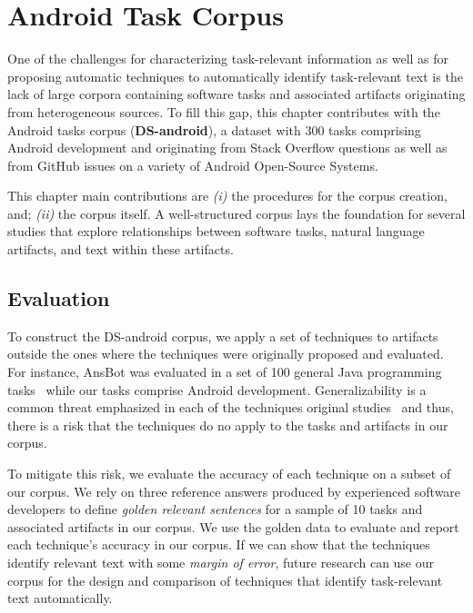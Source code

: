 \setcounter{chapter}{3}
\setcounter{rq}{1}


\chapter{Android Task Corpus}
\label{ch:android-corpus}



One of the challenges for characterizing task-relevant information as well as for proposing automatic techniques to automatically identify task-relevant text is
the lack of large corpora containing
software tasks and associated artifacts originating from heterogeneous sources.
To fill this gap, this chapter contributes with the Android tasks corpus (\textbf{\acs{DS-android}}), a dataset with 300 tasks comprising Android development and originating from Stack Overflow questions
as well as from GitHub issues on a variety of Android Open-Source Systems.



This chapter main contributions are \textit{(i)} the procedures for the corpus creation, and; \textit{(ii)} the corpus itself. A well-structured corpus lays the foundation for several studies that explore relationships between software tasks, natural language artifacts, and text within these artifacts. 








\section{Evaluation}
\label{cp4:evaluation}


To construct the \acs{DS-android} corpus, we apply a set of techniques 
to artifacts outside the ones where the techniques were originally proposed and evaluated.
For instance, \acs{AnsBot} was evaluated in a set of 100 general Java programming tasks~\cite{Xu2017} while our tasks comprise Android development.
Generalizability is a common threat emphasized in each of the techniques original studies~\cite{Xu2017, Lotufo2012, Robillard2015} and thus, there is a risk that the techniques do no apply to 
the tasks and artifacts in our corpus.




To mitigate this risk, we evaluate the accuracy of each technique on a subset of our corpus. We rely on three reference answers produced by 
experienced software developers to define \textit{golden relevant sentences} 
for a sample of 10 tasks and associated artifacts in our corpus. 
We use the golden data to evaluate and report each technique's accuracy in our corpus.
If we can show that the techniques identify relevant text with some \textit{margin of error},
future research can use our corpus for the design and comparison of techniques that identify task-relevant text automatically.




